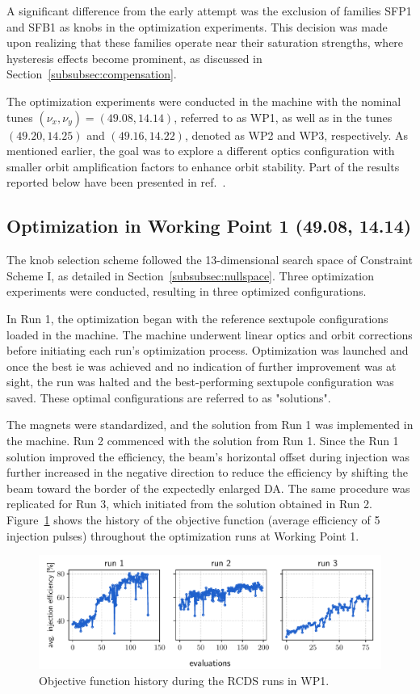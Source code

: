 A significant difference from the early attempt was the exclusion of families SFP1 and SFB1 as knobs in the optimization experiments. This decision was made upon realizing that these families operate near their saturation strengths, where hysteresis effects become prominent, as discussed in Section~\ref{subsubsec:compensation}.

The optimization experiments were conducted in the machine with the nominal tunes $(\nu_x,\nu_y)=(49.08, 14.14)$, referred to as \gls*{WP1}, as well as in the tunes $(49.20, 14.25)$ and $(49.16, 14.22)$, denoted as \gls*{WP2} and \gls*{WP3}, respectively. As mentioned earlier, the goal was to explore a different optics configuration with smaller orbit amplification factors to enhance orbit stability. Part of the results reported below have been presented in ref.~\cite{velloso_online_2023}.

\subsection{Optimization in Working Point 1 (49.08, 14.14)}
The knob selection scheme followed the 13-dimensional search space of Constraint Scheme I, as detailed in Section~\ref{subsubsec:nullspace}. Three optimization experiments were conducted, resulting in three optimized configurations.

In Run 1, the optimization began with the reference sextupole configurations loaded in the machine. The machine underwent linear optics and orbit corrections before initiating each run's optimization process. Optimization was launched and once the best \gls*{ie} was achieved and no indication of further improvement was at sight, the run was halted and the best-performing sextupole configuration was saved. These optimal configurations are referred to as "solutions".

The magnets were standardized, and the solution from Run 1 was implemented in the machine. Run 2 commenced with the solution from Run 1. Since the Run 1 solution improved the efficiency, the beam's horizontal offset during injection was further increased in the negative direction to reduce the efficiency by shifting the beam toward the border of the expectedly enlarged \gls*{DA}. The same procedure was replicated for Run 3, which initiated from the solution obtained in Run 2. Figure~\ref{fig:wp1_history} shows the history of the objective function (average efficiency of 5 injection pulses) throughout the optimization runs at Working Point 1.
\begin{figure}[tb]
    \centering
    \includegraphics[width=\columnwidth]{Images/wp1_objfunc_hist.pdf}
    \caption[Objective function history during the RCDS runs in WP1.]{Objective function history during the \gls*{RCDS} runs in \gls*{WP1}.}
    \label{fig:wp1_history}
\end{figure}
